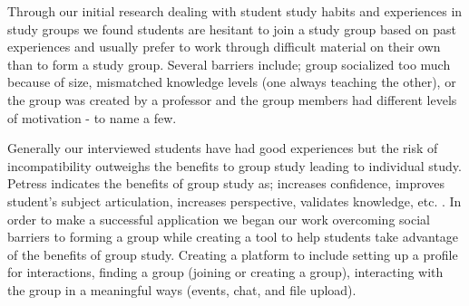 \documentclass{sigchi-ext}
\begin{document}
Through our initial research dealing with student study habits and experiences
in study groups we found students are hesitant to join a study group based on
past experiences and usually prefer to work through difficult material on
their own than to form a study group. Several barriers include; group
socialized too much because of size, mismatched knowledge levels (one always
teaching the other), or the group was created by a professor and the group
members had different levels of motivation - to name a few.

Generally our interviewed students have had good experiences but the risk of
incompatibility outweighs the benefits to group study leading to individual
study. Petress indicates the benefits of group study as; increases confidence,
improves student's subject articulation, increases perspective, validates
knowledge, etc. \cite{petress2004benefits}. In order to make a successful
application we began our work overcoming social barriers to forming a group
while creating a tool to help students take advantage of the benefits of group
study. Creating a platform to include setting up a profile for interactions,
finding a group (joining or creating a group), interacting with the group in a
meaningful ways (events, chat, and file upload).



\end{document}
